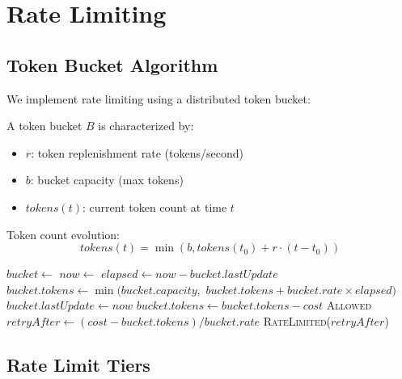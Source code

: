 \section{Rate Limiting}


\subsection{Token Bucket Algorithm}

We implement rate limiting using a distributed token bucket:

\begin{definition}
A token bucket $B$ is characterized by:
\begin{itemize}
    \item $r$: token replenishment rate (tokens/second)
    \item $b$: bucket capacity (max tokens)
    \item $tokens(t)$: current token count at time $t$
\end{itemize}
\end{definition}

Token count evolution:
\begin{equation}
tokens(t) = \min(b, tokens(t_0) + r \cdot (t - t_0))
\end{equation}

\begin{algorithm}
\caption{Distributed Token Bucket}
\begin{algorithmic}[1]
    \State $bucket \gets$ 
    \State $now \gets$ 
    \State {}
    \State $elapsed \gets now - bucket.lastUpdate$
    \State $bucket.tokens \gets \min(bucket.capacity,$
    \State \hspace{4em} $bucket.tokens + bucket.rate \times elapsed)$
    \State $bucket.lastUpdate \gets now$
        \State $bucket.tokens \gets bucket.tokens - cost$
        \State {}
        \State \Return \textsc{Allowed}
    \Else
        \State $retryAfter \gets (cost - bucket.tokens) / bucket.rate$
        \State \Return \textsc{RateLimited}($retryAfter$)
    \EndIf
\EndFunction
\end{algorithmic}
\end{algorithm}

\subsection{Rate Limit Tiers}

